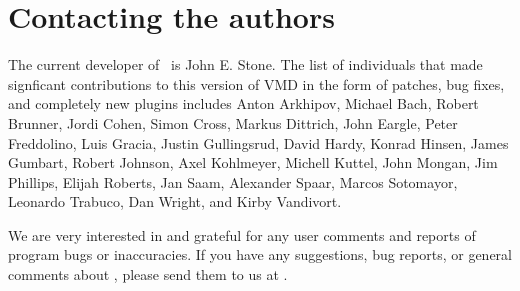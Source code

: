 
%
%
%

\section{Contacting the authors}

The current developer of \VMD\ is John E. Stone.
The list of individuals that made signficant contributions to this 
version of VMD in the form of patches, bug fixes, and completely new plugins 
includes
Anton Arkhipov, Michael Bach, Robert Brunner,
Jordi Cohen, Simon Cross, Markus Dittrich, John Eargle, 
Peter Freddolino, Luis Gracia, Justin Gullingsrud, 
David Hardy, Konrad Hinsen, James Gumbart,
Robert Johnson, Axel Kohlmeyer, Michell Kuttel, 
John Mongan, Jim Phillips, Elijah Roberts, Jan Saam, 
Alexander Spaar, Marcos Sotomayor, 
Leonardo Trabuco, Dan Wright, and Kirby Vandivort.

We are very interested in and grateful for any user comments and
reports of program bugs or inaccuracies.  If you have any suggestions,
bug reports, or general comments about \VMD, please send them to
us at \vmdemail.

